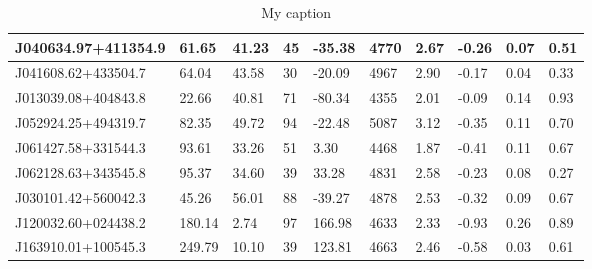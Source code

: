 \documentclass[a4paper,fleqn,usenatbib]{mnras}
\begin{document}
\begin{table}
\begin{tabular}{llllllllll}
J040634.97+411354.9 & 61.65 & 41.23 & 45 & -35.38 & 4770 & 2.67 & -0.26 & 0.07 & 0.51 \\ \hline
J041608.62+433504.7 & 64.04 & 43.58 & 30 & -20.09 & 4967 & 2.90 & -0.17 & 0.04 & 0.33 \\ \hline
J013039.08+404843.8 & 22.66 & 40.81 & 71 & -80.34 & 4355 & 2.01 & -0.09 & 0.14 & 0.93 \\ \hline
J052924.25+494319.7 & 82.35 & 49.72 & 94 & -22.48 & 5087 & 3.12 & -0.35 & 0.11 & 0.70 \\ \hline
J061427.58+331544.3 & 93.61 & 33.26 & 51 & 3.30 & 4468 & 1.87 & -0.41 & 0.11 & 0.67 \\ \hline
J062128.63+343545.8 & 95.37 & 34.60 & 39 & 33.28 & 4831 & 2.58 & -0.23 & 0.08 & 0.27 \\ \hline
J030101.42+560042.3 & 45.26 & 56.01 & 88 & -39.27 & 4878 & 2.53 & -0.32 & 0.09 & 0.67 \\ \hline
J120032.60+024438.2 & 180.14 & 2.74 & 97 & 166.98 & 4633 & 2.33 & -0.93 & 0.26 & 0.89 \\ \hline
J163910.01+100545.3 & 249.79 & 10.10 & 39 & 123.81 & 4663 & 2.46 & -0.58 & 0.03 & 0.61 \\ \hline
\end{tabular}
\caption{My caption}
\label{my-label}
\end{table}
\end{document}
